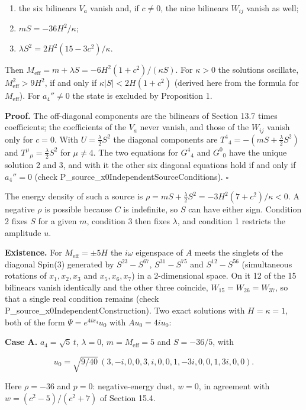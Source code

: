 \documentclass[11pt]{article}
\begin{document}
\begin{enumerate}
\item the six bilinears $V_a$ vanish and, if $c\ne0$, the nine bilinears $W_{ij}$ vanish as well;
\item $mS=-36H^2/\kappa$;
\item $\lambda S^2=2H^2(15-3c^2)/\kappa$.
\end{enumerate}

Then $M_{\mathrm{eff}}=m+\lambda S=-6H^2(1+c^2)/(\kappa S)$. For $\kappa>0$ the solutions oscillate, $M_{\mathrm{eff}}^2>9H^2$, if and only if $\kappa|S|<2H(1+c^2)$ (derived here from the formula for $M_{\mathrm{eff}}$). For $a_4''\ne0$ the state is excluded by Proposition 1.

\textbf{Proof.} The off-diagonal components are the bilinears of Section 13.7 times coefficients; the coefficients of the $V_a$ never vanish, and those of the $W_{ij}$ vanish only for $c=0$. With $U=\tfrac\lambda2S^2$ the diagonal components are $T^4{}_4=-(mS+\tfrac\lambda2S^2)$ and $T^\mu{}_\mu=\tfrac\lambda2S^2$ for $\mu\ne4$. The two equations for $G^4{}_4$ and $G^0{}_0$ have the unique solution 2 and 3, and with it the other six diagonal equations hold if and only if $a_4''=0$ (check P\_source\_x0IndependentSourceConditions). $\square$

The energy density of such a source is $\rho=mS+\tfrac\lambda2S^2=-3H^2(7+c^2)/\kappa<0$. A negative $\rho$ is possible because $C$ is indefinite, so $S$ can have either sign. Condition 2 fixes $S$ for a given $m$, condition 3 then fixes $\lambda$, and condition 1 restricts the amplitude $u$.

\textbf{Existence.} For $M_{\mathrm{eff}}=\pm5H$ the $i\omega$ eigenspace of $A$ meets the singlets of the diagonal Spin(3) generated by $S^{23}-S^{67}$, $S^{31}-S^{75}$ and $S^{12}-S^{56}$ (simultaneous rotations of $x_1,x_2,x_3$ and $x_5,x_6,x_7$) in a 2-dimensional space. On it 12 of the 15 bilinears vanish identically and the other three coincide, $W_{15}=W_{26}=W_{37}$, so that a single real condition remains (check P\_source\_x0IndependentConstruction). Two exact solutions with $H=\kappa=1$, both of the form $\Psi=e^{4ix_4}u_0$ with $Au_0=4iu_0$:

\textbf{Case A.} $a_4=\sqrt5\,t$, $\lambda=0$, $m=M_{\mathrm{eff}}=5$ and $S=-36/5$, with

\[
u_0=\sqrt{9/40}\,(3,-i,0,0,3,i,0,0,1,-3i,0,0,1,3i,0,0).
\]

Here $\rho=-36$ and $p=0$: negative-energy dust, $w=0$, in agreement with $w=(c^2-5)/(c^2+7)$ of Section 15.4.
\end{document}
